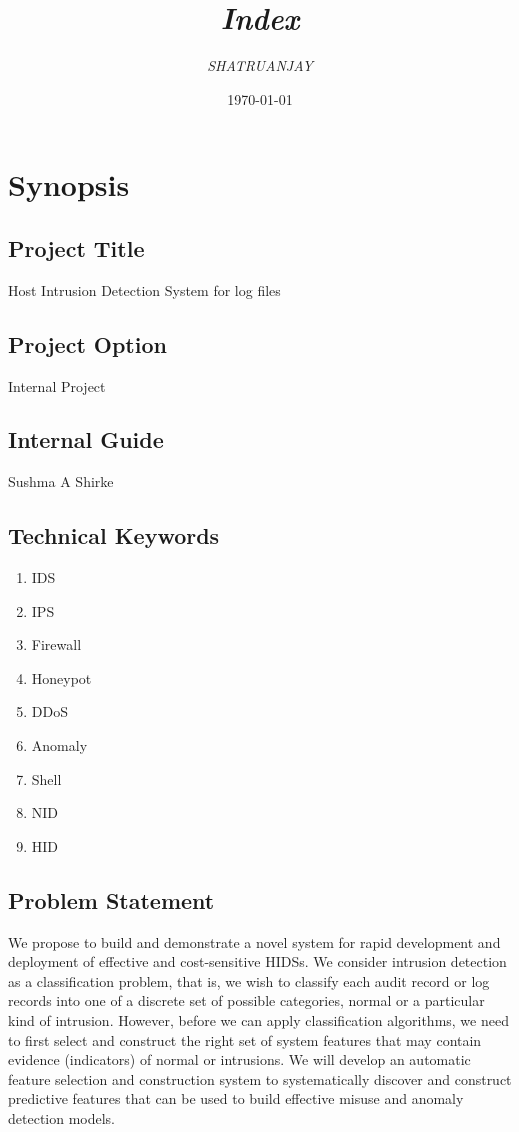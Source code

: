 \documentclass[12pt,a4paper]{report}
\author{\Large \textit{SHATRUANJAY}}
\title{\Huge \textit{\textit{Index}}}
\date{\today}
\begin{document}
\maketitle
\tableofcontents{}
\chapter{Synopsis}
\newpage
\section{Project Title}
Host Intrusion Detection System for log files
\section{Project Option}
Internal Project
\section{Internal Guide}
Sushma A Shirke
\section{Technical Keywords}
\begin{enumerate}
\item	IDS \item	IPS \item	Firewall \item  Honeypot \item DDoS \item	Anomaly	\item	Shell	\item	NID	\item HID
\end{enumerate}

\section{Problem Statement}
We propose to build and demonstrate a novel system for rapid development and deployment of effective and cost-sensitive HIDSs. We consider intrusion detection as a classification problem, that is, we wish to classify each audit record or log records into one of a discrete set of possible categories, normal or a particular kind of intrusion. However, before we can apply classification algorithms, we need to first select and construct the right set of system features that may contain evidence (indicators) of normal or intrusions. We will develop an automatic feature selection and construction system to systematically discover and construct predictive features that can be used to build effective misuse and anomaly detection models. 
\newpage
\end{document}
